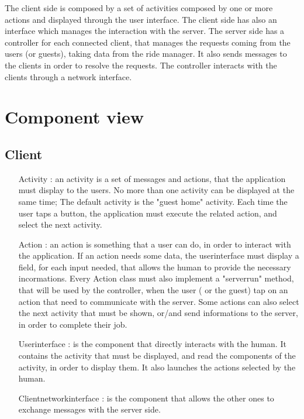 The client side is composed by a set of activities composed by one or more actions and displayed through the user interface.
The client side has also an interface which manages the interaction with the server.
The server side has a controller for each connected client, that manages the requests coming from the users (or guests), 
taking data from the ride manager. It also sends messages to the clients in order to resolve the requests.
The controller interacts with the clients through a network interface.
\section{Component view}
	\subsection{Client}
	 \begin{itemize}
	  \item [Activity]: an activity is a set of messages and actions, that the application must display to the users.
	  No more than one activity can be displayed at the same time;
	  The default activity is the "guest home" activity. Each time the user taps a button, the application must execute
	  the related action, and select the next activity.
	  \item [Action]: an action is something that a user can do, in order to interact with the application.
	  If an action needs some data, the userinterface must display a field, for each input needed, that allows the human
	  to provide the necessary incormations. Every Action class must also implement a "serverrun" method, that will be used by
	  the controller, when the user ( or the guest) tap on an action that need to communicate with the server. Some actions 
	  can also select the next activity that must be shown, or/and send informations to the server, in order to complete their job.
	  \item [Userinterface]: is the component that directly interacts with the human.
	  It contains the activity that must be displayed, and read the components of the activity, in order to display them.
	  It also launches the actions selected by the human.
	  \item[Clientnetworkinterface]: is the component that allows the other ones to exchange messages with the server side.
	 \end{itemize}

